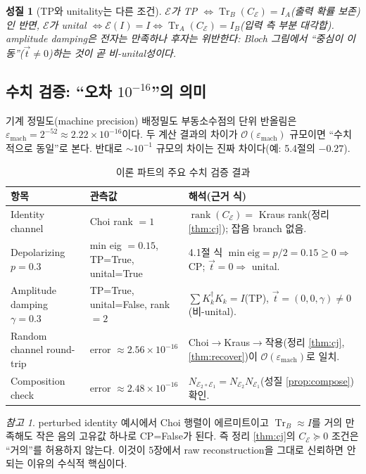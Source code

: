\documentclass[11pt,a4paper]{article}
\newcommand{\E}{\mathcal{E}}
\newcommand{\Tr}{\operatorname{Tr}}
\newcommand{\rank}{\operatorname{rank}}
\theoremstyle{definition}
\theoremstyle{plain}
\newtheorem{property}{성질}[section]
\theoremstyle{remark}
\newtheorem*{remark}{참고}
\begin{document}
\begin{property}[TP와 unitality는 다른 조건]
$\E$가 TP $\iff\Tr_B(C_\E)=I_A$(출력 확률 보존)인 반면, $\E$가 unital $\iff\E(I)=I\iff\Tr_A(C_\E)=I_B$(입력 측 부분 대각합). amplitude damping은 전자는 만족하나 후자는 위반한다: Bloch 그림에서 ``중심이 이동''($\vec t\neq0$)하는 것이 곧 비-unital성이다.
\end{property}

\subsection{수치 검증: ``오차 $10^{-16}$''의 의미}

\begin{mathbox}{기계 정밀도(machine precision)}
배정밀도 부동소수점의 단위 반올림은 $\varepsilon_{\mathrm{mach}}=2^{-52}\approx2.22\times10^{-16}$이다. 두 계산 결과의 차이가 $\mathcal O(\varepsilon_{\mathrm{mach}})$ 규모이면 ``수치적으로 동일''로 본다. 반대로 $\sim10^{-1}$ 규모의 차이는 진짜 차이다(예: 5.4절의 $-0.27$).
\end{mathbox}

\begin{table}[H]
\centering\small
\begin{tabularx}{\textwidth}{p{}p{}X}
\toprule
항목 & 관측값 & 해석(근거 식) \\
\midrule
Identity channel & Choi rank $=1$ & $\rank(C_\E)=$ Kraus rank(정리 \ref{thm:cj}); 잡음 branch 없음. \\
Depolarizing $p=0.3$ & min eig $=0.15$, TP=True, unital=True & 4.1절 식 $\min\mathrm{eig}=p/2=0.15\ge0\Rightarrow$ CP; $\vec t=0\Rightarrow$ unital. \\
Amplitude damping $\gamma=0.3$ & TP=True, unital=False, rank$=2$ & $\sum K_k^\dagger K_k=I$(TP), $\vec t=(0,0,\gamma)\neq0$(비-unital). \\
Random channel round-trip & error $\approx2.56\times10^{-16}$ & Choi$\to$Kraus$\to$작용(정리 \ref{thm:cj},\ref{thm:recover})이 $\mathcal O(\varepsilon_{\mathrm{mach}})$로 일치. \\
Composition check & error $\approx2.48\times10^{-16}$ & $N_{\E_2\circ\E_1}=N_{\E_2}N_{\E_1}$(성질 \ref{prop:compose}) 확인. \\
\bottomrule
\end{tabularx}
\caption{이론 파트의 주요 수치 검증 결과}
\label{tab:theory-results}
\end{table}

\begin{remark}
perturbed identity 예시에서 Choi 행렬이 에르미트이고 $\Tr_B\approx I$를 거의 만족해도 작은 음의 고유값 하나로 CP=False가 된다. 즉 정리 \ref{thm:cj}의 $C_\E\succeq0$ 조건은 ``거의''를 허용하지 않는다. 이것이 5장에서 raw reconstruction을 그대로 신뢰하면 안 되는 이유의 수식적 핵심이다.
\end{remark}
\end{document}

